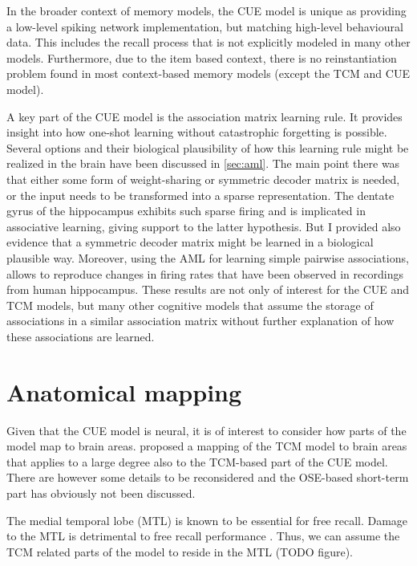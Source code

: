 In the broader context of memory models, the CUE model is unique as providing a low-level spiking network implementation, but matching high-level behavioural data.
This includes the recall process that is not explicitly modeled in many other models.
Furthermore, due to the item based context, there is no reinstantiation problem found in most context-based memory models (except the TCM and CUE model).

A key part of the CUE model is the association matrix learning rule.
It provides insight into how one-shot learning without catastrophic forgetting is possible.
Several options and their biological plausibility of how this learning rule might be realized in the brain have been discussed in \cref{sec:aml}.
The main point there was that either some form of weight-sharing or symmetric decoder matrix is needed, or the input needs to be transformed into a sparse representation.
The dentate gyrus of the hippocampus exhibits such sparse firing and is implicated in associative learning, giving support to the latter hypothesis.
But I provided also evidence that a symmetric decoder matrix might be learned in a biological plausible way.
Moreover, using the AML for learning simple pairwise associations, allows to reproduce changes in firing rates that have been observed in recordings from human hippocampus.
These results are not only of interest for the CUE and TCM models, but many other cognitive models that assume the storage of associations in a similar association matrix without further explanation of how these associations are learned.


\section{Anatomical mapping}

Given that the CUE model is neural, it is of interest to consider how parts of the model map to brain areas.
\Textcite{howard2005} proposed a mapping of the TCM model to brain areas that applies to a large degree also to the TCM-based part of the CUE model.
There are however some details to be reconsidered and the OSE-based short-term part has obviously not been discussed.

The medial temporal lobe (MTL) is known to be essential for free recall.
Damage to the MTL is detrimental to free recall performance \parencite{graf1984}.
Thus, we can assume the TCM related parts of the model to reside in the MTL (TODO figure).

